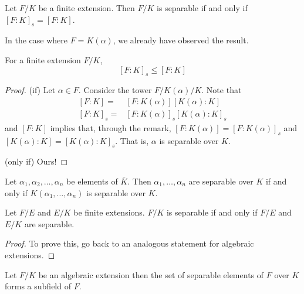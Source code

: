 \vspace{2ex}
\begin{thm}
Let $F/K$ be a finite extension. Then $F/K$ is separable if and only if $[F:K]_{s}=[F:K]$. 
\end{thm}
\vspace{2ex}
\begin{rmk}
In the case where $F=K(\alpha )$, we already have observed the result.
\end{rmk}
\vspace{2ex}
\begin{rmk}
For a finite extension $F/K$, 
\[[F:K]_{s}\leq [F:K]\]
\end{rmk}
\vspace{2ex}
\begin{proof}
(if) Let $\alpha \in F$. Consider the tower $F/K(\alpha )/K$. Note that 
\[\begin{align*}
[F:K]=&[F:K(\alpha )][K(\alpha ):K]\\
[F:K]_{s}=&[F:K(\alpha )]_{s}[K(\alpha ):K]_{s}
\end{align*}\]
and $[F:K]$ implies that, through the remark, $[F:K(\alpha )]=[F:K(\alpha )]_{s}$ and $[K(\alpha ):K]=[K(\alpha ):K]_{s}$. That is, $\alpha $ is separable over $K$.

\bigskip

(only if) Ours! 
\end{proof}
\vspace{2ex}
\begin{cor}
Let $\alpha_1,\alpha_2,\ldots ,\alpha _{n}$ be elements of $\bar{K}$. Then $\alpha _{1},\ldots ,\alpha _{n}$ are separable over $K$ if and only if $K(\alpha _{1},\ldots ,\alpha _{n})$ is separable over $K$.
\end{cor}
\vspace{2ex}
\begin{cor}
Let $F/E$ and $E/K$ be finite extensions. $F/K$ is separable if and only if $F/E$ and $E/K$ are separable.  
\end{cor}
\vspace{2ex}
\begin{proof}
To prove this, go back to an analogous statement for algebraic extensions.
\end{proof}
\vspace{2ex}
\begin{cor}
Let $F/K$ be an algebraic extension then the set of separable elements of $F$ over $K$ forms a subfield of $F$.
\end{cor}
\vspace{2ex}
 
